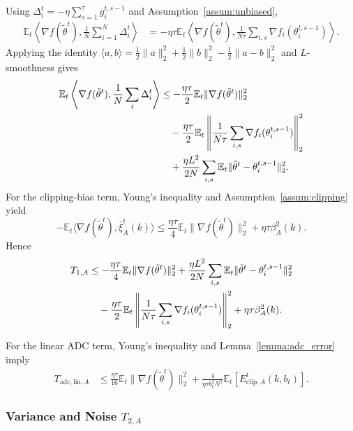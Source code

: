 \documentclass[conference]{IEEEtran}
\begin{document}
Using $\Delta_i^t=-\eta\sum_{s=1}^{\tau}g_i^{t,s-1}$ and Assumption~\ref{assum:unbiased},
\begin{align}
    \mathbb{E}_t\left\langle\nabla f(\tilde\theta^t),\frac1N\sum_{i=1}^{N}\Delta_i^t\right\rangle
    &=-\eta\tau\mathbb{E}_t\left\langle\nabla f(\tilde\theta^t),
    \frac{1}{N\tau}\sum_{i,s}\nabla f_i(\theta_i^{t,s-1})\right\rangle.
\end{align}
Applying the identity $\langle a,b\rangle=\frac12\|a\|_2^2+\frac12\|b\|_2^2-\frac12\|a-b\|_2^2$ and $L$-smoothness gives
\begin{align}
    \mathbb{E}_t\left\langle\nabla f(\tilde\theta^t),\frac1N\sum_i\Delta_i^t\right\rangle
    &\le
    -\frac{\eta\tau}{2}\mathbb{E}_t\|\nabla f(\tilde\theta^t)\|_2^2
    \notag\\
    &\quad-
    \frac{\eta\tau}{2}\mathbb{E}_t\left\|\frac{1}{N\tau}\sum_{i,s}\nabla f_i(\theta_i^{t,s-1})\right\|_2^2
    \notag\\
    &\quad+
    \frac{\eta L^2}{2N}\sum_{i,s}\mathbb{E}_t\|\tilde\theta^t-\theta_i^{t,s-1}\|_2^2.
\end{align}
For the clipping-bias term, Young's inequality and Assumption~\ref{assum:clipping} yield
\begin{equation}
    -\mathbb{E}_t\langle\nabla f(\tilde\theta^t),\bar\xi_A^t(k)\rangle
    \le
    \frac{\eta\tau}{4}\mathbb{E}_t\|\nabla f(\tilde\theta^t)\|_2^2+
    \eta\tau\beta_A^2(k).
\end{equation}
Hence
\begin{align}
    \label{eqn:t1_bound_new}
    T_{1,A}
    &\le
    -\frac{\eta\tau}{4}\mathbb{E}_t\|\nabla f(\tilde\theta^t)\|_2^2
    +\frac{\eta L^2}{2N}\sum_{i,s}\mathbb{E}_t\|\tilde\theta^t-\theta_i^{t,s-1}\|_2^2
    \notag\\
    &\quad-
    \frac{\eta\tau}{2}\mathbb{E}_t\left\|\frac{1}{N\tau}\sum_{i,s}\nabla f_i(\theta_i^{t,s-1})\right\|_2^2
    +\eta\tau\beta_A^2(k).
\end{align}

For the linear ADC term, Young's inequality and Lemma~\ref{lemma:adc_error} imply
\begin{align}
    \label{eqn:t_adc_lin_bound}
    T_{\mathrm{adc,lin},A}
    &\le
    \frac{\eta\tau}{16}\mathbb{E}_t\|\nabla f(\tilde\theta^t)\|_2^2
    +
    \frac{4}{\eta\tau b_t^2N^2}\mathbb{E}_t[E_{\mathrm{clip},A}^t(k,b_t)].
\end{align}

\subsubsection{Variance and Noise $T_{2,A}$}
\end{document}

